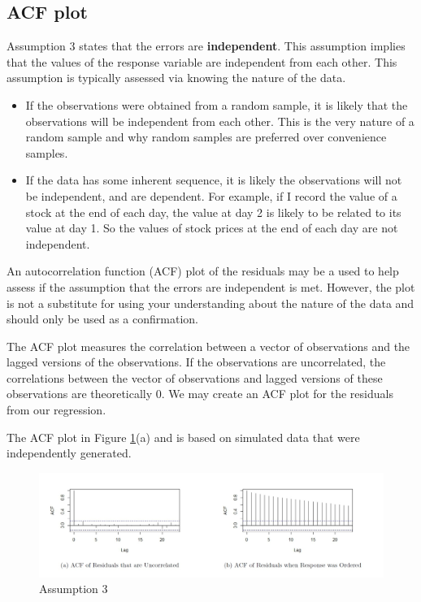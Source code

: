 \documentclass[
]{book}
\begin{document}
\hypertarget{acf-plot}{%
\subsection{ACF plot}\label{acf-plot}}

Assumption 3 states that the errors are \textbf{independent}. This assumption implies that the values of the response variable are independent from each other. This assumption is typically assessed via knowing the nature of the data.

\begin{itemize}
\item
  If the observations were obtained from a random sample, it is likely that the observations will be independent from each other. This is the very nature of a random sample and why random samples are preferred over convenience samples.
\item
  If the data has some inherent sequence, it is likely the observations will not be independent, and are dependent. For example, if I record the value of a stock at the end of each day, the value at day 2 is likely to be related to its value at day 1. So the values of stock prices at the end of each day are not independent.
\end{itemize}

An autocorrelation function (ACF) plot of the residuals may be a used to help assess if the assumption that the errors are independent is met. However, the plot is not a substitute for using your understanding about the nature of the data and should only be used as a confirmation.

The ACF plot measures the correlation between a vector of observations and the lagged versions of the observations. If the observations are uncorrelated, the correlations between the vector of observations and lagged versions of these observations are theoretically 0. We may create an ACF plot for the residuals from our regression.

The ACF plot in Figure \ref{fig:ass3}(a) and is based on simulated data that were independently generated.

\begin{figure}
\centering
\includegraphics{images/ass3.jpg}
\caption{\label{fig:ass3}Assumption 3}
\end{figure}
\end{document}
